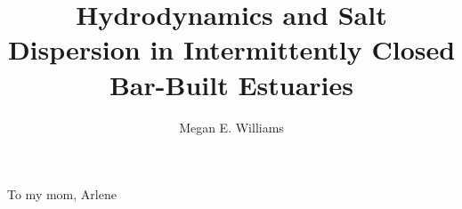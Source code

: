 \documentclass{ucbthesis}
\begin{document}


\title{Hydrodynamics and Salt Dispersion in Intermittently Closed Bar-Built Estuaries}
\author{Megan E. Williams}

\maketitle    %
\copyrightpage  %


\begin{frontmatter}

\begin{dedication}
\null\vfil
\begin{center}
To my mom, Arlene
\end{center} 
\vfil\null
\end{dedication}

\tableofcontents
\clearpage
\listoffigures
\listoftables

\begin{acknowledgements}


\end{acknowledgements}

\end{frontmatter}


\pagestyle{headings}  %

%















\printbibliography
\end{document}
